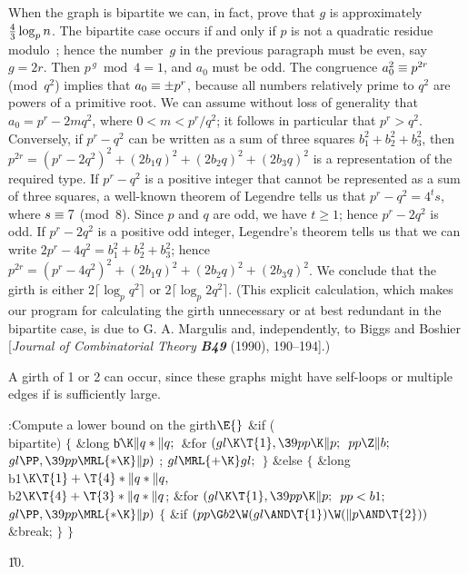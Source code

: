 When the graph is bipartite we can, in fact, prove that $g$ is
approximately ${4\over3}\log_p n$. The bipartite case occurs if and
only if $p$ is not a quadratic residue modulo~; hence the
number~$g$ in the previous paragraph must be even, say $g=2r$. Then
$p^{\,g}\bmod4=1$, and $a_0$ must be odd.  The congruence $a_0^2\=p^{2r}$
(mod~$q^2$) implies that $a_0\=\pm p^r$, because all numbers
relatively prime to $q^2$ are powers of a primitive root. We can
assume without loss of generality that $a_0=p^r-2mq^2$, where
$0<m<p^r/q^2$; it follows in particular that $p^r>q^2$.  Conversely,
if $p^r-q^2$ can be written as a sum of three squares
$b_1^2+b_2^2+b_3^2$, then
$p^{2r}=(p^r-2q^2)^2+(2b_1q)^2+(2b_2q)^2+(2b_3q)^2$ is a
representation of the required type. If $p^r-q^2$ is a positive
integer that cannot be represented as a sum of three squares, a
well-known theorem of Legendre tells us that $p^r-q^2=4^ts$, where
$s\=7$ (mod~8).  Since $p$ and $q$ are odd, we have $t\ge1$; hence
$p^r-2q^2$ is odd. If $p^r-2q^2$ is a positive odd integer, Legendre's
theorem tells us that we can write $2p^r-4q^2=b_1^2+b_2^2+b_3^2$;
hence $p^{2r}=(p^r-4q^2)^2+ (2b_1q)^2+(2b_2q)^2+(2b_3q)^2$. We
conclude that the girth is either $2\lceil\log_pq^2\rceil$ or
$2\lceil\log_p2q^2\rceil$. (This explicit calculation, which makes our
program for calculating the girth unnecessary or at best redundant in
the bipartite case, is due to G. A. Margulis and, independently, to
Biggs and Boshier [{\sl Journal of Combinatorial Theory\/ \bf B49}
(1990), 190--194].)

A girth of 1 or 2 can occur, since these graphs might have self-loops
or multiple edges if  is sufficiently large.

\Y\B\4:Compute a lower bound  on the girth\X${}\E{}$\6
\&{if} (\\{bipartite})\5
${}\{{}$\5
\1\&{long} \|b${}\K\|q*\|q;{}$\7
\&{for} ${}(\\{gl}\K\T{1},\39\\{pp}\K\|p;{}$ ${}\\{pp}\Z\|b;{}$ ${}\\{gl}\PP,%
\39\\{pp}\MRL{*{\K}}\|p){}$\1\5
;\2\6
${}\\{gl}\MRL{+{\K}}\\{gl};{}$\6
\4${}\}{}$\5
\2\&{else}\5
${}\{{}$\5
\1\&{long} \\{b1}${}\K\T{1}+\T{4}*\|q*\|q,{}$ \\{b2}${}\K\T{4}+\T{3}*\|q*%
\|q{}$;\7
\&{for} ${}(\\{gl}\K\T{1},\39\\{pp}\K\|p;{}$ ${}\\{pp}<\\{b1};{}$ ${}\\{gl}\PP,%
\39\\{pp}\MRL{*{\K}}\|p){}$\5
${}\{{}$\1\6
\&{if} ${}(\\{pp}\G\\{b2}\W(\\{gl}\AND\T{1})\W(\|p\AND\T{2})){}$\1\5
\&{break};\2\6
\4${}\}{}$\2\6
\4${}\}{}$\2\par
\U10.\fi

